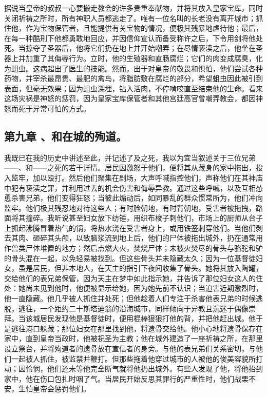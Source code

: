 据说当皇帝的叔叔一心要搬走教会的许多贵重奉献物，并将其放入皇家宝库，同时关闭祈祷之所时，所有神职人员都逃走了。唯有一位名叫的长老没有离开城市；抓住他，作为宝物保管者，且能提供有关宝物的情况，便极其残暴地虐待他；最后，在每一种酷刑下他都勇敢地回应，并因信仰宣认而备受称许之后，下令用剑将他处死。当掠夺了圣器后，他将它们扔在地上并开始嘲弄；在尽情亵渎之后，他坐在圣器上并加重了其侮辱行为。立时，他的生殖器和直肠腐烂；它们的肉变成腐臭，化为蛆虫。这病超出了医生的技能。然而，出于对皇帝的敬畏和惧怕，他们尝试各种药物，并宰杀最昂贵、最肥的禽鸟，将脂肪敷在腐烂的部分，希望蛆虫因此被引到表面，但毫无效果；因为蛆虫深埋，钻入活肉，不停啃咬直至结束他的生命。看来这场灾祸是神怒的惩罚，因为皇家宝库保管者和其他宫廷高官曾嘲弄教会，都因神怒而死于异常可怕的方式。\par


\subsection{第九章 、和在城的殉道。}

我既已在我的历史中讲述至此，并记述了及之死，我以为宜当叙述关于三位兄弟——、和——之死的若干详情。居民因激怒于他们，便将其从藏身的家中拖出，投入监牢，加以殴打。然后他们聚集在剧场，大声呼喊指控他们，声称他们在其神庙中犯有亵渎之罪，并利用过去的机会伤害和侮辱异教。通过这些呼喊，以及互相怂恿杀害兄弟，他们变得狂怒；当彼此煽动后，如同暴乱的群众惯常所为，他们冲向监牢。他们极其残忍地对待这些人；有时脸朝地，有时背朝地，受害者被拖拽，路面将其撞碎。我听说甚至妇女放下纺锤，用织布梭子刺他们，市场上的厨师从台子上抓起沸腾冒着热气的锅，将热水浇在受害者身上，或用铁签刺穿他们。当他们剥去其肉、砸碎其头颅，以致脑浆流到地上后，他们的尸体被拖出城外，扔在通常用作兽类尸体堆置的地方；然后点燃大火，焚烧尸体；未被火焚尽的骨头与骆驼和驴的骨头混在一起，以免轻易被找到。但这些骨头并未隐藏太久；因为一位基督徒妇女，虽是居民，但非本地人，在天主的指引下夜间收集了骨头。她将其放入陶罐，交给他们的表兄弟保管，因为天主在梦中如此指示她，并告诉了那位妇女这人的住处：她尚未见到他时，他便被显示给她，因为她先前不认识；当迫害近期激烈时，他一直隐藏。他几乎被人抓住并处死；但他趁着人们专注于杀害他表兄弟的时候逃脱，逃往，一个距约二十斯塔迪翁的沿海城市，同样倾向于异教且沉迷于偶像崇拜。当该城居民发现他是基督徒时，便用棍棒狠狠打他的背，并把他赶出城。他于是逃往港口躲藏；那位妇女在那里找到他，将遗骨交给他。他小心地将遗骨保存在家中，直到皇帝当政时，他被祝圣为主教；他在城外建造了一座祈祷之所，在那里设立祭台，并将殉道者的遗骨放在宣信者的身旁。与他的表兄弟们关系密切，与他们一起被人抓住，被监禁并鞭打。但那些拖着他穿过城市的人被他的俊美容貌所打动；因怜悯，他们还未等他完全断气就将他扔出城外。有些人发现了他，将他抬到家中，他在伤口包扎时咽了气。当居民开始反思其罪行的严重性时，他们战栗不安，生怕皇帝会惩罚他们。\par

